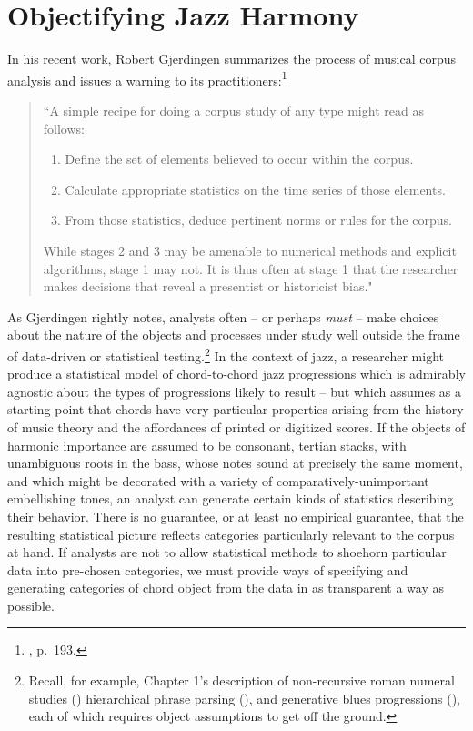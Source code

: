 \chapter{Objectifying Jazz Harmony}

In his recent work, Robert Gjerdingen summarizes the process of musical corpus analysis and issues a warning to its practitioners:\footnote{\cite{gjerdingen2014}, p.\ 193.}
\begin{quote}
``A simple recipe for doing a corpus study of any type
might read as follows:
\begin{enumerate}
	\item Define the set of elements believed to occur within
the corpus.
	\item Calculate appropriate statistics on the time series of
those elements.
	\item From those statistics, deduce pertinent norms or
rules for the corpus.
\end{enumerate}
While stages 2 and 3 may be amenable to numerical
methods and explicit algorithms, stage 1 may not. It is
thus often at stage 1 that the researcher makes decisions
that reveal a presentist or historicist bias."
\end{quote}

As Gjerdingen rightly notes, analysts often -- or perhaps \emph{must} -- make choices about the nature of the objects and processes under study well outside the frame of data-driven or statistical testing.\footnote{Recall, for example, Chapter 1's description of non-recursive roman numeral studies (\cite{tymoczko2010local}) hierarchical phrase parsing (\cite{rohrmeier2007}), and generative blues progressions (\cite{steedman1984}), each of which requires object assumptions to get off the ground.}  In the context of jazz, a researcher might produce a statistical model of chord-to-chord jazz progressions which is admirably agnostic about the types of progressions likely to result -- but which assumes as a starting point that chords have very particular properties arising from the history of music theory and the affordances of printed or digitized scores.  If the objects of harmonic importance are assumed to be consonant, tertian stacks, with unambiguous roots in the bass, whose notes sound at precisely the same moment, and which might be decorated with a variety of comparatively-unimportant embellishing tones, an analyst can generate certain kinds of statistics describing their behavior.  There is no guarantee, or at least no empirical guarantee, that the resulting statistical picture reflects categories particularly relevant to the corpus at hand.  If analysts are not to allow statistical methods to shoehorn particular data into pre-chosen categories, we must provide ways of specifying and generating categories of chord object from the data in as transparent a way as possible.

